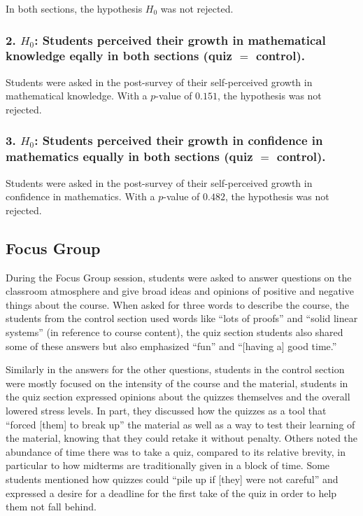 In both sections, the hypothesis $H_0$ was not rejected.

\subsubsection{2. $H_0$: Students perceived their growth in mathematical knowledge eqally in both sections (quiz $=$ control).}

Students were asked in the post-survey of their self-perceived growth in mathematical knowledge. With a $p$-value of $0.151$, the hypothesis was not rejected.

\subsubsection{3. $H_0$: Students perceived their growth in confidence in mathematics equally in both sections (quiz $=$ control).}

Students were asked in the post-survey of their self-perceived growth in confidence in mathematics. With a $p$-value of $0.482$, the hypothesis was not rejected.

\subsection{Focus Group}

During the Focus Group session, students were asked to answer questions on the classroom atmosphere and give broad ideas and opinions of positive and negative things about the course. When asked for three words to describe the course, the students from the control section used words like ``lots of proofs'' and ``solid linear systems'' (in reference to course content), the quiz section students also shared some of these answers but also emphasized ``fun'' and ``[having a] good time.''

Similarly in the answers for the other questions, students in the control section were mostly focused on the intensity of the course and the material, students in the quiz section expressed opinions about the quizzes themselves and the overall lowered stress levels. In part, they discussed how the quizzes as a tool that ``forced [them] to break up'' the material as well as a way to test their learning of the material, knowing that they could retake it without penalty. Others noted the abundance of time there was to take a quiz, compared to its relative brevity, in particular to how midterms are traditionally given in a block of time. Some students mentioned how quizzes could ``pile up if [they] were not careful'' and expressed a desire for a deadline for the first take of the quiz in order to help them not fall behind.

